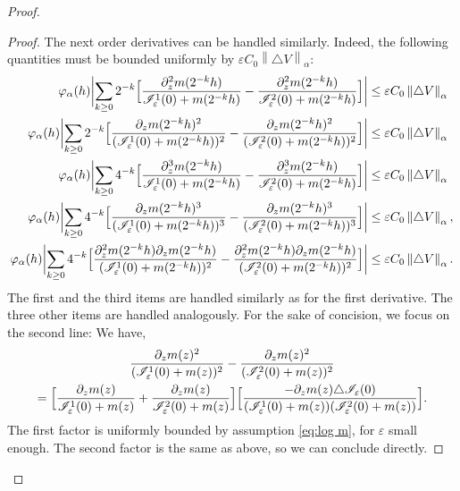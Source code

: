 \documentclass[10pt]{amsart}
\let\mathcal\mathscr
\newcommand{\cI}{\mathcal{I}}
\theoremstyle{plain}
\theoremstyle{definition}
\let\eps\varepsilon
\newcommand{\bbabs}[1]{\biggl\lvert#1\biggr\rvert}
\newcommand{\nalph}[1]{\left\lVert#1\right\rVert_\alpha}
\newcommand{\vphia}{\varphi_\alpha}
\begin{document}
\begin{proof}
\begin{proof}
The next order derivatives can be handled similarly. Indeed, the following quantities must be bounded uniformly by $\eps C_{0} \nalph{\triangle V}$:
\begin{align*}
\vphia(h) \bbabs{ \sum_{k \geq 0} 2^{-k} \Bigl[ \dfrac{\partial_z^2 m(2^{-k}h)}{\cI_\eps^1(0)+m(2^{-k}h)}-\dfrac{\partial_z^2 m(2^{-k}h)}{\cI_\eps^2(0)+m(2^{-k}h)} \Bigr] }& \leq\eps C_{0} \nalph{\triangle V}\\
\vphia(h) \bbabs{\sum_{k \geq 0} 2^{-k} \Bigl[ \dfrac{\partial_z m(2^{-k}h)^2}{(\cI_\eps^1(0)+m(2^{-k}h))^2}- \dfrac{\partial_z m(2^{-k}h)^2}{(\cI_\eps^2(0)+m(2^{-k}h))^2} \Bigr] }& \leq \eps C_{0} \nalph{\triangle V} \\
\vphia(h) \bbabs{ \sum_{k \geq 0} 4^{-k} \Bigl[ \dfrac{\partial_z^3 m(2^{-k}h)}{\cI_\eps^1(0)+m(2^{-k}h)}-\dfrac{\partial_z^3 m(2^{-k}h)}{\cI_\eps^2(0)+m(2^{-k}h)} \Bigr] }& \leq\eps C_{0} \nalph{\triangle V} \\
\vphia(h) \bbabs{\sum_{k \geq 0} 4^{-k} \Bigl [ \dfrac{\partial_z m(2^{-k}h)^3}{(\cI_\eps^1(0)+m(2^{-k}h))^3} -\dfrac{\partial_z m(2^{-k}h)^3}{(\cI_\eps^2(0)+m(2^{-k}h))^3} \Bigr ] }& \leq\eps C_{0} \nalph{\triangle V},\\
\vphia(h) \bbabs{ \sum_{k \geq 0} 4^{-k} \Bigl [ \dfrac{\partial^2_z m(2^{-k}h)\partial_z m(2^{-k}h)}{(\cI_\eps^1	 (0)+m(2^{-k}h))^2} -\dfrac{\partial^2_z m(2^{-k}h)\partial_z m(2^{-k}h)}{(\cI_\eps^2(0)+m(2^{-k}h))^2} \Bigr ]} & \leq \eps C_{0} \nalph{\triangle V}.
\end{align*}
The first and the third items are handled similarly as for the first derivative. The three other items are handled analogously. For the sake of concision, we focus on the second line:
We have,\vspace*{-3pt}
\begin{multline*}
\dfrac{\partial_z m(z)^2}{(\cI_\eps^1(0)+m(z))^2}- \dfrac{\partial_z m(z)^2}{(\cI_\eps^2(0)+m(z))^2} \\
= \Bigl[ \dfrac{\partial_z m(z)}{\cI_\eps^1(0)+m(z)}+\dfrac{\partial_z m(z)}{\cI_\eps^2(0)+m(z)} \Bigr] \Bigl[ \dfrac{- \partial_z m(z) \triangle \cI_\eps (0) }{(\cI_\eps^1(0)+m(z))(\cI_\eps^2(0)+m(z))} \Bigr].
\end{multline*}
The first factor is uniformly bounded by assumption \eqref{eq:log m}, for $\eps$ small enough. The second factor is the same as above, so we can conclude directly.
\end{proof}


\end{proof}
\end{document}

